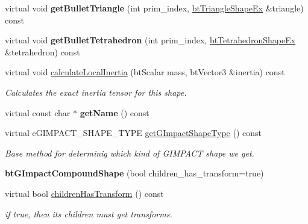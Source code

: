 \begin{DoxyCompactItemize}
\mbox{\label{classbtGImpactCompoundShape_a39de42da0f8e91f0bdce41eb7df70983}} 
virtual void {\bfseries get\+Bullet\+Triangle} (int prim\+\_\+index, \hyperlink{classbtTriangleShapeEx}{bt\+Triangle\+Shape\+Ex} \&triangle) const
\item 
\mbox{\label{classbtGImpactCompoundShape_aff66df97b1355545cbc5aecd85ef5432}} 
virtual void {\bfseries get\+Bullet\+Tetrahedron} (int prim\+\_\+index, \hyperlink{classbtTetrahedronShapeEx}{bt\+Tetrahedron\+Shape\+Ex} \&tetrahedron) const
\item 
\mbox{\label{classbtGImpactCompoundShape_a36786f1e5efb6a0ddb6e22a993a3b09b}} 
virtual void \hyperlink{classbtGImpactCompoundShape_a36786f1e5efb6a0ddb6e22a993a3b09b}{calculate\+Local\+Inertia} (bt\+Scalar mass, bt\+Vector3 \&inertia) const
\begin{DoxyCompactList}\small\item\em Calculates the exact inertia tensor for this shape. \end{DoxyCompactList}\item 
\mbox{\label{classbtGImpactCompoundShape_a5d5b8c3c0e0e7542fd3a71271c97619f}} 
virtual const char $\ast$ {\bfseries get\+Name} () const
\item 
virtual e\+G\+I\+M\+P\+A\+C\+T\+\_\+\+S\+H\+A\+P\+E\+\_\+\+T\+Y\+PE \hyperlink{classbtGImpactCompoundShape_a6f75f32671f5555df85d4efd342c1c67}{get\+G\+Impact\+Shape\+Type} () const
\begin{DoxyCompactList}\small\item\em Base method for determinig which kind of G\+I\+M\+P\+A\+CT shape we get. \end{DoxyCompactList}\item 
\mbox{\label{classbtGImpactCompoundShape_a315f703c2006537efde116aceef17b57}} 
{\bfseries bt\+G\+Impact\+Compound\+Shape} (bool children\+\_\+has\+\_\+transform=true)
\item 
\mbox{\label{classbtGImpactCompoundShape_ab5879b0f493aee95f2703c196ace6f21}} 
virtual bool \hyperlink{classbtGImpactCompoundShape_ab5879b0f493aee95f2703c196ace6f21}{children\+Has\+Transform} () const
\begin{DoxyCompactList}\small\item\em if true, then its children must get transforms. \end{DoxyCompactList}\item 

\end{DoxyCompactItemize}
